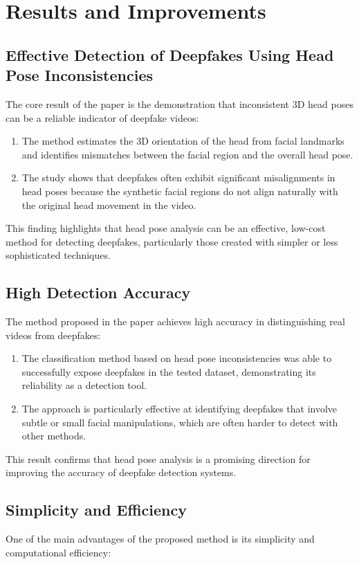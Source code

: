 \documentclass{report}
\begin{document}
	
	
	\section{Results and Improvements}
	\subsection{Effective Detection of Deepfakes Using Head Pose Inconsistencies}
	The core result of the paper is the demonstration that inconsistent 3D head poses can be a reliable indicator of deepfake videos:
	\begin{enumerate}
		\item 
		The method estimates the 3D orientation of the head from facial landmarks and identifies mismatches between the facial region and the overall head pose.
		
		\item 
		The study shows that deepfakes often exhibit significant misalignments in head poses because the synthetic facial regions do not align naturally with the original head movement in the video.
	\end{enumerate}
	This finding highlights that head pose analysis can be an effective, low-cost method for detecting deepfakes, particularly those created with simpler or less sophisticated techniques.
	
	
	\subsection{High Detection Accuracy}
	The method proposed in the paper achieves high accuracy in distinguishing real videos from deepfakes:
	
	\begin{enumerate}
		\item 
		The classification method based on head pose inconsistencies was able to successfully expose deepfakes in the tested dataset, demonstrating its reliability as a detection tool.
		
		\item 
		The approach is particularly effective at identifying deepfakes that involve subtle or small facial manipulations, which are often harder to detect with other methods.
	\end{enumerate}
	This result confirms that head pose analysis is a promising direction for improving the accuracy of deepfake detection systems.
	
	
	\subsection{Simplicity and Efficiency}
	One of the main advantages of the proposed method is its simplicity and computational efficiency:
	
\end{document}

